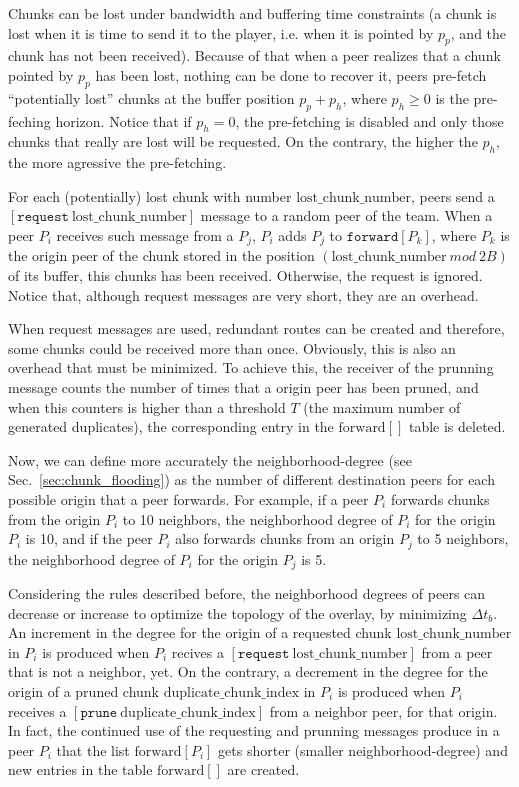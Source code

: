 

\label{sec:routes_discovery}

Chunks can be lost under bandwidth and buffering time constraints (a
chunk is lost when it is time to send it to the player, i.e. when it
is pointed by $p_p$, and the chunk has not been received). Because of
that when a peer realizes that a chunk pointed by $p_p$ has been lost,
nothing can be done to recover it, peers pre-fetch ``potentially
lost'' chunks at the buffer position $p_p+p_h$, where $p_h\geq 0$ is
the pre-feching horizon. Notice that if $p_h=0$, the pre-fetching is
disabled and only those chunks that really are lost will be
requested. On the contrary, the higher the $p_h$, the more agressive
the pre-fetching.

For each (potentially) lost chunk with number
$\text{lost\_chunk\_number}$, peers send a
$[\mathtt{request}~\text{lost\_chunk\_number}]$ message to a random
peer of the team. When a peer $P_i$ receives such message from a
$P_j$, $P_i$ adds $P_j$ to $\mathtt{forward}[P_k]$, where $P_k$ is the
origin peer of the chunk stored in the position
$(\text{lost\_chunk\_number}~\mathit{mod}~2B)$ of its buffer, this
chunks has been received. Otherwise, the request is ignored. Notice
that, although request messages are very short, they are an overhead.

When request messages are used, redundant routes can be created and
therefore, some chunks could be received more than once. Obviously,
this is also an overhead that must be minimized. To achieve this, the receiver of the prunning message counts the number of times that a origin peer has been pruned, and when this counters is higher than a threshold $T$ (the maximum number of generated duplicates), the corresponding entry in the $\text{forward}[]$ table is deleted.

Now, we can define more accurately the \gls{neighborhood-degree} (see
Sec.~\ref{sec:chunk_flooding}) as the number of different destination
peers for each possible origin that a peer forwards. For example, if a
peer $P_i$ forwards chunks from the origin $P_i$ to 10 neighbors, the
neighborhood degree of $P_i$ for the origin $P_i$ is 10, and if the
peer $P_i$ also forwards chunks from an origin $P_j$ to 5 neighbors,
the neighborhood degree of $P_i$ for the origin $P_j$ is 5.

Considering the rules described before, the neighborhood degrees of
peers can decrease or increase to optimize the topology of the
overlay, by minimizing $\Delta t_b$. An increment in the degree for the origin of a requested
chunk $\text{lost\_chunk\_number}$ in $P_i$ is produced when $P_i$
recives a $[\mathtt{request}~\text{lost\_chunk\_number}]$ from a peer
that is not a neighbor, yet. On the contrary, a decrement in the
degree for the origin of a pruned chunk
$\text{duplicate\_chunk\_index}$ in $P_i$ is produced when $P_i$
receives a $[\mathtt{prune}~\text{duplicate\_chunk\_index}]$ from a
neighbor peer, for that origin. In fact, the continued use of the
requesting and prunning messages produce in a peer $P_i$ that the list
$\text{forward}[P_i]$ gets shorter (smaller \gls{neighborhood-degree})
and new entries in the table $\text{forward}[]$ are created.
